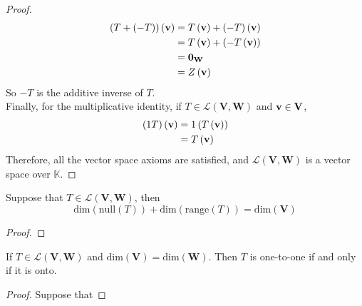 \begin{proof}
   \begin{align*}
       \left( T + \left( -T \right) \right)\left( \vb{v} \right) &= T \left( \vb{v} \right) + \left( -T \right)\left( \vb{v} \right) \\
       &= T \left( \vb{v} \right) + \left( -T \left( \vb{v} \right) \right) \\
       &= \vb{0}_{\mathbf{W}} \\
       &= Z \left( \vb{v} \right)
   \end{align*}
   So \( -T \) is the additive inverse of \( T \). \\
   Finally, for the multiplicative identity, if \( T \in \mathcal{L} \left( \mathbf{V}, \mathbf{W} \right) \) and \( \vb{v} \in \mathbf{V} \),
   \begin{align*}
       \left( 1 T \right)\left( \vb{v} \right) &= 1 \left( T \left( \vb{v} \right) \right) \\
       &= T \left( \vb{v} \right)
   \end{align*}
   Therefore, all the vector space axioms are satisfied, and \( \mathcal{L} \left( \mathbf{V}, \mathbf{W} \right) \) is a vector space over \( \mathbb{K} \).
\end{proof}

\begin{theorem}\label{thm:Rank-Nullity}
    Suppose that \( T \in \mathcal{L} \left( \mathbf{V}, \mathbf{W} \right) \), then 
    \[ \mathrm{dim} \left( \mathrm{null} \left( T \right) \right) + \mathrm{dim} \left( \mathrm{range} \left( T \right) \right) = \mathrm{dim} \left( \mathbf{V} \right)  \]
\end{theorem}
\begin{proof}
    
\end{proof}

\begin{corollary}\label{thm:equal-dim-imp-equiv-of-inj-and-surj}
    If \( T \in \mathcal{L} \left( \mathbf{V}, \mathbf{W} \right) \) and \( \mathrm{dim} \left( \mathbf{V} \right) = \mathrm{dim} \left( \mathbf{W} \right) \). Then \( T \) is one-to-one if and only if it is onto. 
\end{corollary}
\begin{proof}
    Suppose that 
\end{proof}
